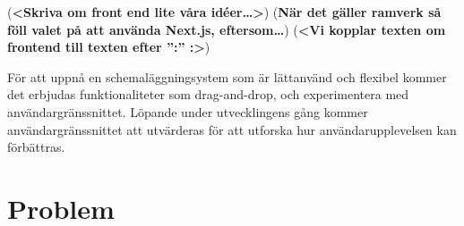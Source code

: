 \documentclass[nomenclature, english, bibtex]{kththesis}
\newcommand*{\sweExpl}[1]{\todo[inline, backgroundcolor=kth-lightblue40]{#1}}  %
\begin{document}



(\textbf{<Skriva om front end lite våra idéer…>})
(\textbf{När det gäller ramverk så föll valet på att använda Next.js, eftersom…})
(\textbf{<Vi kopplar texten om frontend till texten efter ”:” :>}) 

För att uppnå en schemaläggningsystem som är lättanvänd och flexibel kommer det erbjudas funktionaliteter som drag-and-drop, och experimentera med användargränssnittet. Löpande under utvecklingens gång kommer användargränssnittet att utvärderas för att utforska hur användarupplevelsen kan förbättras.


\section{Problem}
\label{sec:problem}


\end{document}
